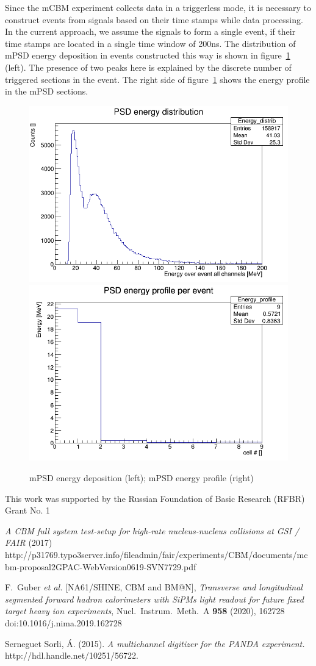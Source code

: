 \documentclass[a4paper,11pt]{article}
\begin{document}
Since the mCBM experiment collects data in a triggerless mode, it is necessary to construct events from signals based on their time stamps while data processing. In the current approach, we assume the signals to form a single event, if their time stamps are located in a single time window of 200ns. The distribution of mPSD energy deposition in events constructed this way is shown in figure~\ref{fig:7} (left). The presence of two peaks here is explained by the discrete number of triggered sections in the event. The right side of figure~\ref{fig:7} shows the energy profile in the mPSD sections.

\begin{figure}[htbp]
\centering %
\includegraphics[width=.45\textwidth]{PsdEdepInEvent_calibrd.png}
\qquad
\includegraphics[width=.45\textwidth]{PsdEprofileInEvent_calibrd.png}
\caption{\label{fig:7} mPSD energy deposition (left); mPSD energy profile (right)}
\end{figure}



\acknowledgments
This work was supported by the Russian Foundation of Basic Research (RFBR) Grant No. 1



\begin{thebibliography}{99}


\emph{A CBM full system test-setup for high-rate nucleus-nucleus collisions at GSI / FAIR} (2017) http://p31769.typo3server.info/fileadmin/fair/experiments/CBM/documents/mcbm-proposal2GPAC-WebVersion0619-SVN7729.pdf


F.~Guber \textit{et al.} [NA61/SHINE, CBM and BM@N],
\emph{Transverse and longitudinal segmented forward hadron calorimeters with SiPMs light readout for future fixed target heavy ion experiments},
Nucl.\ Instrum.\ Meth.\ A \textbf{958} (2020), 162728
doi:10.1016/j.nima.2019.162728


Serneguet Sorli, Á. (2015). \emph{A multichannel digitizer for the PANDA experiment.} http://hdl.handle.net/10251/56722.



\end{thebibliography}
\end{document}
